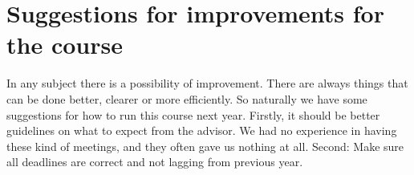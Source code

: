 \section{Suggestions for improvements for the course}\label{sec:refl_improve}
In any subject there is a possibility of improvement. There are always things that can be done better, clearer or more efficiently. So naturally we have some suggestions for how to run this course next year.
\newline
\newline
Firstly, it should be better guidelines on what to expect from the advisor. We had no experience in having these kind of meetings, and they often gave us nothing at all.
\newline
\newline
Second: Make sure all deadlines are correct and not lagging from previous year.


